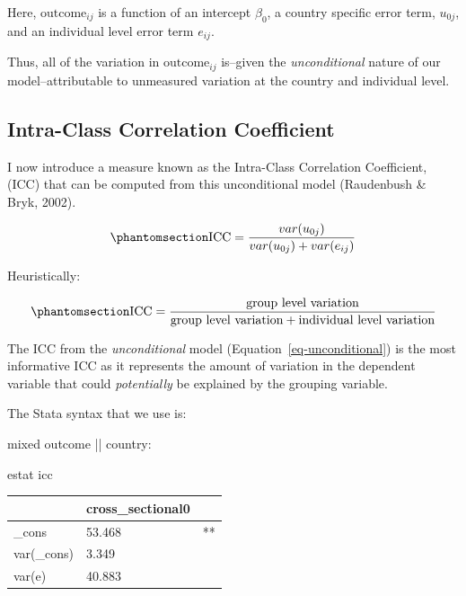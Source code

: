 \documentclass[
  letterpaper,
  DIV=11,
  numbers=noendperiod]{scrreprt}
\newenvironment{Shaded}{\begin{snugshade}}{\end{snugshade}}
\newcommand{\KeywordTok}[1]{\textcolor[rgb]{0.00,0.23,0.31}{#1}}
\newcommand{\NormalTok}[1]{\textcolor[rgb]{0.00,0.23,0.31}{#1}}
\begin{document}
Here, \(\text{outcome}_{ij}\) is a function of an intercept \(\beta_0\),
a country specific error term, \(u_{0j}\), and an individual level error
term \(e_{ij}\).

Thus, all of the variation in \(\text{outcome}_{ij}\) is--given the
\emph{unconditional} nature of our model--attributable to unmeasured
variation at the country and individual level.

\subsection{Intra-Class Correlation Coefficient}\label{sec-ICC}

I now introduce a measure known as the Intra-Class Correlation
Coefficient, (ICC) that can be computed from this unconditional model
(Raudenbush \& Bryk, 2002).

\begin{equation}\phantomsection\label{eq-ICC}{\text{ICC} = \frac{var(u_{0j})}{var(u_{0j}) + var(e_{ij})}}\end{equation}

Heuristically:

\begin{equation}\phantomsection\label{eq-ICCheuristic}{\text{ICC} = \frac{\text{group level variation}}{\text{group level variation} + \text{individual level variation}}}\end{equation}

The ICC from the \emph{unconditional} model
(Equation~\ref{eq-unconditional}) is the most informative ICC as it
represents the amount of variation in the dependent variable that could
\emph{potentially} be explained by the grouping variable.

The Stata syntax that we use is:

\begin{Shaded}
\begin{Highlighting}[]

\NormalTok{mixed outcome || country: }

\KeywordTok{estat}\NormalTok{ icc}
\end{Highlighting}
\end{Shaded}

\begin{longtable}[]{@{}lll@{}}
\toprule\noalign{}
& cross\_sectional0 & \\
\midrule\noalign{}
\endhead
\bottomrule\noalign{}
\endlastfoot
\_cons & 53.468 & ** \\
var(\_cons) & 3.349 & \\
var(e) & 40.883 & \\
\end{longtable}
\end{document}

